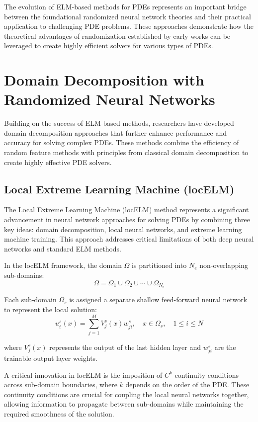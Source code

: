 \documentclass[11pt]{article}
\begin{document}
The evolution of ELM-based methods for PDEs represents an important bridge between the foundational randomized neural network theories and their practical application to challenging PDE problems. These approaches demonstrate how the theoretical advantages of randomization established by early works can be leveraged to create highly efficient solvers for various types of PDEs.

\section{Domain Decomposition with Randomized Neural Networks}

Building on the success of ELM-based methods, researchers have developed domain decomposition approaches that further enhance performance and accuracy for solving complex PDEs. These methods combine the efficiency of random feature methods with principles from classical domain decomposition to create highly effective PDE solvers.

\subsection{Local Extreme Learning Machine (locELM)}

The Local Extreme Learning Machine (locELM) method \citep{Dong2021a} represents a significant advancement in neural network approaches for solving PDEs by combining three key ideas: domain decomposition, local neural networks, and extreme learning machine training. This approach addresses critical limitations of both deep neural networks and standard ELM methods.

In the locELM framework, the domain $\Omega$ is partitioned into $N_e$ non-overlapping sub-domains:
\begin{equation}
    \Omega = \Omega_1 \cup \Omega_2 \cup \cdots \cup \Omega_{N_e}
\end{equation}

Each sub-domain $\Omega_s$ is assigned a separate shallow feed-forward neural network to represent the local solution:
\begin{equation}
    u^s_i(x) = \sum_{j=1}^{M} V^s_j(x) w^s_{ji}, \quad x \in \Omega_s, \quad 1 \leq i \leq N
\end{equation}

where $V^s_j(x)$ represents the output of the last hidden layer and $w^s_{ji}$ are the trainable output layer weights.

A critical innovation in locELM is the imposition of $C^k$ continuity conditions across sub-domain boundaries, where $k$ depends on the order of the PDE. These continuity conditions are crucial for coupling the local neural networks together, allowing information to propagate between sub-domains while maintaining the required smoothness of the solution.
\end{document}
